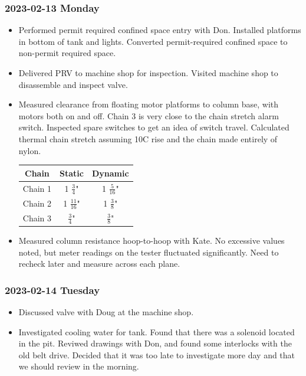 \documentclass{scrartcl}
\begin{document}
\subsubsection{2023-02-13 Monday}
\begin{itemize}
	\item Performed permit required confined space entry with Don.  Installed platforms in bottom of tank and lights.  
	Converted permit-required confined space to non-permit required space.
	\item Delivered PRV to machine shop for inspection.  Visited machine
	shop to disassemble and inspect valve.  
	\item Measured clearance from floating motor platforms to column base, with motors 
	both on and off.  Chain 3  is very close to the chain stretch alarm switch.  
	Inspected spare switches to get an idea of switch travel.  Calculated thermal chain 
	stretch assuming 10\degree C rise and the chain made entirely of nylon.
	\begin{center}
		\def\arraystretch{1.3}
		\begin{tabular}{ |c|c|c| }
			\hline
			Chain & Static & Dynamic \\
			\hline
			Chain 1 & 1 \(\frac{3}{4}\)" & 1 \(\frac{5}{16}\)" \\
			Chain 2 & 1 \(\frac{11}{16}\)" & 1 \(\frac{3}{8}\)" \\
			Chain 3 & \(\frac{3}{4}\)" & \(\frac{3}{8}\)" \\
			\hline
		\end{tabular}
	\end{center}
	\item Measured column resistance hoop-to-hoop with Kate.  No excessive 
	values noted, but meter readings on the tester fluctuated significantly.
	Need to recheck later and measure across each plane.
\end{itemize}

\subsubsection{2023-02-14 Tuesday}
\begin{itemize}
    \item Discussed valve with Doug at the machine shop.
    \item Investigated cooling water for tank.  Found that there was a
    solenoid located in the pit.  Reviwed drawings with Don, and found 
	some interlocks with the old belt drive.  Decided that it was too late 
	to investigate more day and that we should review in the morning.
\end{itemize}
\end{document}
